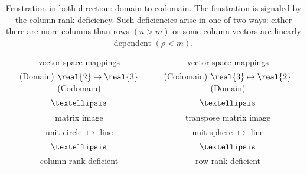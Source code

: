 \begin{table}[htdp]
\begin{center}
\begin{tabular}{cc}
vector space mappings & vector space mappings\\
(Domain) $\real{2} \mapsto \real{3}$ (Codomain) & (Codomain) $\real{3} \mapsto \real{2}$ (Domain)\\
 $\textellipsis$ & $\textellipsis$ \\
 matrix image & transpose matrix image \\
unit circle $\mapsto$ line & unit sphere $\mapsto$ line\\
 $\textellipsis$ & $\textellipsis$ \\
column rank deficient & row rank deficient\\[10pt]
\end{tabular}
\end{center}
\label{tab:interpII:c}
\caption{Frustration in both direction: domain to codomain. The frustration is signaled by the column rank deficiency. Such deficiencies arise in one of two ways: either there are more columns than rows $(n>m)$ or some column vectors are linearly dependent $(\rho<m)$.}
\end{table}

\endinput
